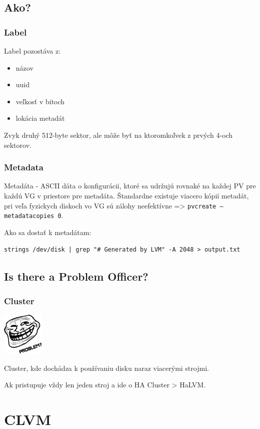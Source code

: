 \documentclass{beamer}
\begin{document}
\subsection{Ako?}

\begin{frame}
  \frametitle{Label}
  Label pozostáva z:
  \begin{itemize}
  \item názov
  \item uuid
  \item veľkosť v bitoch
  \item lokácia metadát
  \end{itemize}
   Zvyk druhý 512-byte sektor, ale môže byť na ktoromkoľvek z prvých 4-och sektorov.
\end{frame}

\begin{frame}
  \frametitle{Metadata}
  Metadáta - ASCII dáta o konfigurácii, ktoré sa udržujú rovnaké na každej PV pre každú VG v priestore pre metadáta.
  Štandardne existuje viacero kópií metadát, pri veľa fyzickych diskoch vo VG sú zálohy neefektívne => \texttt{pvcreate --metadatacopies 0}.
  
  Ako sa dostať k metadátam:
  
  \texttt{strings /dev/disk | grep "\# Generated by LVM" -A 2048 > output.txt}
\end{frame}

\subsection{Is there a Problem Officer?}

\begin{frame}
  \frametitle{Cluster}
  \includegraphics[width=2cm]{problem.png}
  
  
Cluster, kde dochádza k používaniu disku naraz viacerými strojmi.

Ak pristupuje vždy len jeden stroj a ide o HA Cluster > HaLVM.
\end{frame}

\section{CLVM}
\end{document}
